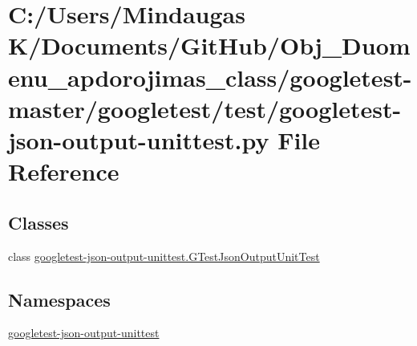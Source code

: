 \hypertarget{googletest-master_2googletest_2test_2googletest-json-output-unittest_8py}{}\section{C\+:/\+Users/\+Mindaugas K/\+Documents/\+Git\+Hub/\+Obj\+\_\+\+Duomenu\+\_\+apdorojimas\+\_\+class/googletest-\/master/googletest/test/googletest-\/json-\/output-\/unittest.py File Reference}
\label{googletest-master_2googletest_2test_2googletest-json-output-unittest_8py}
\subsection*{Classes}
\begin{DoxyCompactItemize}
\item 
class \mbox{\hyperlink{classgoogletest-json-output-unittest_1_1_g_test_json_output_unit_test}{googletest-\/json-\/output-\/unittest.\+G\+Test\+Json\+Output\+Unit\+Test}}
\end{DoxyCompactItemize}
\subsection*{Namespaces}
\begin{DoxyCompactItemize}
\item 
 \mbox{\hyperlink{namespacegoogletest-json-output-unittest}{googletest-\/json-\/output-\/unittest}}
\end{DoxyCompactItemize}
